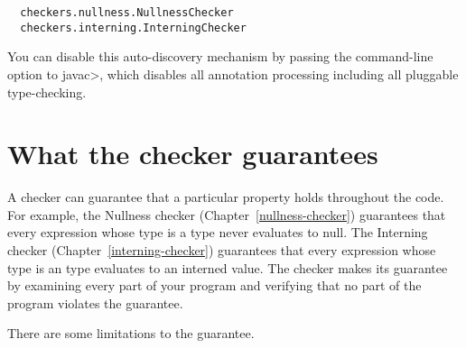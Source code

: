 \begin{smaller}
\begin{Verbatim}
  checkers.nullness.NullnessChecker
  checkers.interning.InterningChecker
\end{Verbatim}
\end{smaller}

You can disable this auto-discovery mechanism by passing the
 command-line option to \<javac>, which disables all
annotation processing including all pluggable type-checking.




\section{What the checker guarantees\label{checker-guarantees}}

A checker can guarantee that a particular property holds throughout the
code.  For example, the Nullness checker (Chapter~\ref{nullness-checker})
guarantees that every expression whose type is a  type never
evaluates to null.  The Interning checker (Chapter~\ref{interning-checker})
guarantees that every expression whose type is an  type
evaluates to an interned value.  The checker makes its guarantee by
examining every part of your program and verifying that no part of the
program violates the guarantee.

There are some limitations to the guarantee.


